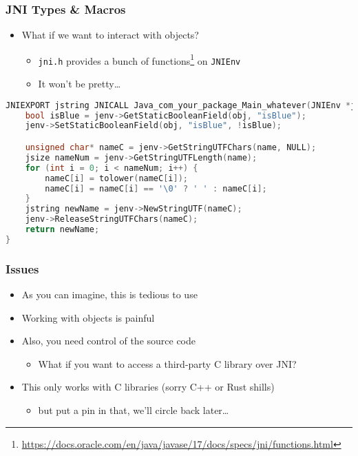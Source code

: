 \documentclass[10pt,mathserif]{beamer}
\begin{document}
	\begin{frame}[fragile]
		\frametitle{JNI Types \& Macros}

		\begin{itemize}
			\item What if we want to interact with objects?
			\begin{itemize}
				\item \lstinline{jni.h} provides a bunch of functions\footnote{\href{https://docs.oracle.com/en/java/javase/17/docs/specs/jni/functions.html}{https://docs.oracle.com/en/java/javase/17/docs/specs/jni/functions.html}} on \lstinline{JNIEnv}
				\item It won't be pretty\dots
			\end{itemize}
		\end{itemize}

		\begin{lstlisting}[language=c]
JNIEXPORT jstring JNICALL Java_com_your_package_Main_whatever(JNIEnv *jenv, jobject obj, jstring name) {
	bool isBlue = jenv->GetStaticBooleanField(obj, "isBlue");
	jenv->SetStaticBooleanField(obj, "isBlue", !isBlue);

	unsigned char* nameC = jenv->GetStringUTFChars(name, NULL);
	jsize nameNum = jenv->GetStringUTFLength(name);
	for (int i = 0; i < nameNum; i++) {
		nameC[i] = tolower(nameC[i]);
		nameC[i] = nameC[i] == '\0' ? ' ' : nameC[i];
	}
	jstring newName = jenv->NewStringUTF(nameC);
	jenv->ReleaseStringUTFChars(nameC);
	return newName;
}
		\end{lstlisting}
	\end{frame}

	\begin{frame}
		\frametitle{Issues}

		\begin{itemize}
			\item As you can imagine, this is tedious to use
			\item Working with objects is painful
			\item Also, you need control of the source code
			\begin{itemize}
				\item What if you want to access a third-party C library over JNI?
			\end{itemize}
			\item This only works with C libraries (sorry C++ or Rust shills)
			\begin{itemize}
				\item but put a pin in that, we'll circle back later\dots
			\end{itemize}
		\end{itemize}
	\end{frame}
\end{document}
